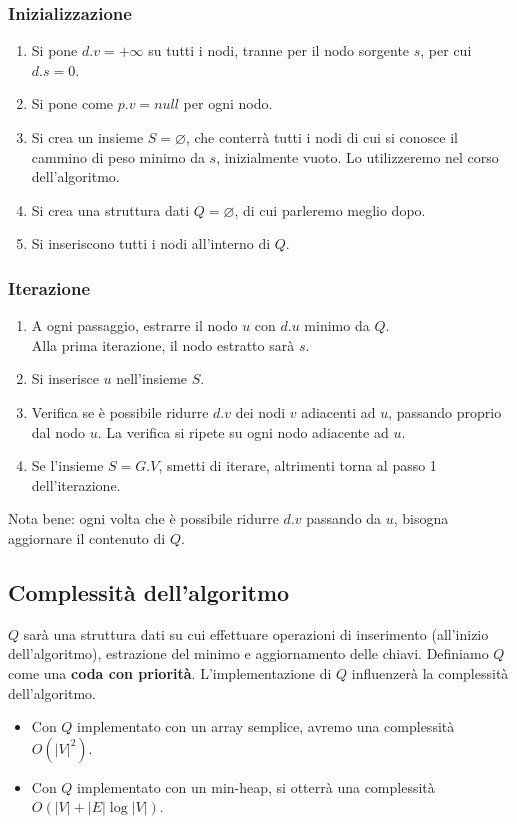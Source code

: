\subsubsection{Inizializzazione}
\begin{enumerate}
	
	\item Si pone $d.v= +\infty$ su tutti i nodi, tranne per il nodo sorgente $s$, per cui $d.s=0$.
	
	\item Si pone come $p.v = null$ per ogni nodo.
	
	\item Si crea un insieme $S = \varnothing$, che conterrà tutti i nodi di cui si conosce il cammino di peso minimo da $s$, inizialmente vuoto. Lo utilizzeremo nel corso dell'algoritmo.
	
	\item Si crea una struttura dati $Q = \varnothing$, di cui parleremo meglio dopo.
	
	\item Si inseriscono tutti i nodi all'interno di $Q$.
\end{enumerate}

\subsubsection{Iterazione}
\begin{enumerate}
	\item A ogni passaggio, estrarre il nodo $u$ con $d.u$ minimo da $Q$.\\
	Alla prima iterazione, il nodo estratto sarà $s$.
	
	\item Si inserisce $u$ nell'insieme $S$.
	
	\item Verifica se è possibile ridurre $d.v$ dei nodi $v$ adiacenti ad $u$, passando proprio dal nodo $u$. La verifica si ripete su ogni nodo adiacente ad $u$. 
	
	\item Se l'insieme $S = G.V$, smetti di iterare, altrimenti torna al passo 1 dell'iterazione.
\end{enumerate}
Nota bene: ogni volta che è possibile ridurre $d.v$ passando da $u$, bisogna aggiornare il contenuto di $Q$.


\subsection{Complessità dell'algoritmo}
$Q$ sarà una struttura dati su cui effettuare operazioni di inserimento (all'inizio dell'algoritmo), estrazione del minimo e aggiornamento delle chiavi. Definiamo $Q$ come una \textbf{coda con priorità}. L'implementazione di $Q$ influenzerà la complessità dell'algoritmo.
\begin{itemize}
	\item Con $Q$ implementato con un array semplice, avremo una complessità $O(|V|^2)$.
	\item Con $Q$ implementato con un min-heap, si otterrà una complessità $O(|V|+|E|\log|V|)$.
\end{itemize}



